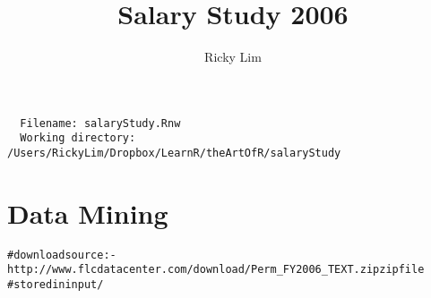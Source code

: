 \documentclass{article}\usepackage{graphicx, color}
\makeatletter
\newcommand{\hlcomment}[1]{\textcolor[rgb]{0.180392156862745,0.6,0.341176470588235}{#1}}%
\newenvironment{kframe}{%
 \def\at@end@of@kframe{}%
 \ifinner\ifhmode%
  \def\at@end@of@kframe{\end{minipage}}%
  \begin{minipage}{\columnwidth}%
 \fi\fi%
 \def\FrameCommand##1{\hskip\@totalleftmargin \hskip-\fboxsep
 \colorbox{shadecolor}{##1}\hskip-\fboxsep
     \hskip-\linewidth \hskip-\@totalleftmargin \hskip\columnwidth}%
 \MakeFramed {\advance\hsize-\width
   \@totalleftmargin\z@ \linewidth\hsize
   \@setminipage}}%
 {\par\unskip\endMakeFramed%
 \at@end@of@kframe}
\newenvironment{knitrout}{}{} %
\makeatother
\begin{document}
\author{Ricky Lim}
\title{Salary Study 2006}
\maketitle

\begin{verbatim}
  Filename: salaryStudy.Rnw 
  Working directory: /Users/RickyLim/Dropbox/LearnR/theArtOfR/salaryStudy 
\end{verbatim}

\section{Data Mining}
\begin{knitrout}
\color{fgcolor}\begin{kframe}
\begin{alltt}

\hlcomment{# download source: - http://www.flcdatacenter.com/download/Perm_FY2006_TEXT.zip zip file}
\hlcomment{# stored in input/}


\end{alltt}
\end{kframe}
\end{knitrout}
\end{document}

